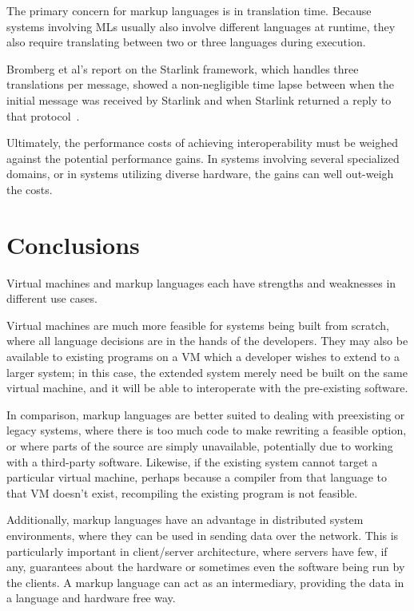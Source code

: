 \documentclass{sig-alternate}
\begin{document}
The primary concern for markup languages is in translation time. Because systems involving MLs usually also involve different languages at runtime, they also require translating between two or three languages during execution.

Bromberg et al's report on the Starlink framework, which handles three translations per message, showed a non-\linebreak negligible time lapse between when the initial message was received by Starlink and when Starlink returned a reply to that protocol~\cite{Bromberg:2011}.

Ultimately, the performance costs of achieving interoperability must be weighed against the potential performance gains. In systems involving several specialized domains, or in systems utilizing diverse hardware, the gains can well out-weigh the costs.



\section{Conclusions}\label{conclusions}


Virtual machines and markup languages each have strengths and weaknesses in different use cases.

Virtual machines are much more feasible for systems being built from scratch, where all language decisions are in the hands of the developers. They may also be available to existing programs on a VM which a developer wishes to extend to a larger system; in this case, the extended system merely need be built on the same virtual machine, and it will be able to interoperate with the pre-existing software.

In comparison, markup languages are better suited to dealing with preexisting or legacy systems, where there is too much code to make rewriting a feasible option, or where parts of the source are simply unavailable, potentially due to working with a third-party software. Likewise, if the existing system cannot target a particular virtual machine, perhaps because a compiler from that language to that VM doesn't exist, recompiling the existing program is not feasible.

Additionally, markup languages have an advantage in distributed system environments, where they can be used in sending data over the network. This is particularly important in client/server architecture, where servers have few, if any, guarantees about the hardware or sometimes even the software being run by the clients. A markup language can act as an intermediary, providing the data in a language and hardware free way.
\end{document}
